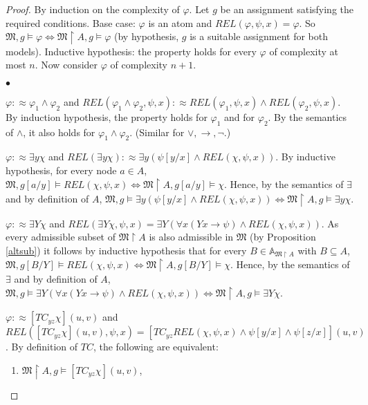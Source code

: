 \documentclass{LMCS}
\newcommand{\frM}{\mathfrak{M}}
\begin{document}
\begin{proof}
By induction on the complexity of $\varphi$. Let $g$ be an
assignment satisfying the required conditions. Base case:
$\varphi$ is an atom and $REL(\varphi,\psi,x)=\varphi$. So $\frM,g
\models \varphi \Leftrightarrow \frM \upharpoonright A,g \models
\varphi$ (by hypothesis, $g$ is a suitable assignment for both
models). Inductive hypothesis: the property holds for every
$\varphi$ of complexity at most $n$. Now consider $\varphi$ of
complexity $n+1$.
\begin{iteMize}{$\bullet$}
 \item  $\varphi :\approx\varphi_1 \wedge \varphi_2$ and $REL(\varphi_1 \wedge \varphi_2,\psi,x):\approx REL(\varphi_1,\psi,x)\wedge REL(\varphi_2,\psi,x)$. By induction hypothesis, the property holds for $\varphi_1$ and for $\varphi_2$. By the semantics of $\wedge$, it also holds for $\varphi_1 \wedge \varphi_2$. (Similar for $\vee, \rightarrow, \neg$.)
 \item $\varphi :\approx \exists y \chi$ and $REL(\exists y \chi):\approx\exists y (\psi[y/x] \land REL(\chi,\psi,x))$. By inductive hypothesis, for every node $a \in A$, $\frM,g[a/y] \models REL(\chi,\psi,x) \Leftrightarrow \frM \upharpoonright A, g[a/y] \models \chi$. Hence, by the semantics of $\exists$ and by definition of $A$, $\frM,g \models \exists y (\psi[y/x] \land REL(\chi,\psi,x)) \Leftrightarrow \frM \upharpoonright A, g \models \exists y \chi$.
 \item $\varphi :\approx\exists Y \chi$ and $REL(\exists Y
   \chi,\psi,x)=\exists Y (\forall x(Yx \rightarrow \psi) \land
   REL(\chi,\psi,x))$. As every admissible subset of $\frM
   \upharpoonright A$ is also admissible in $\frM$ (by Proposition
   \ref{altsub}) it follows by inductive hypothesis that for every $B
   \in \mathbb{A}_{\frM\upharpoonright A}$ with $B\subseteq A$, $\frM,g[B/Y] \models REL(\chi,\psi,x) \Leftrightarrow \frM \upharpoonright A, g[B/Y] \models \chi$. Hence, by the semantics of $\exists$ and by definition of $A$, $\frM,g \models \exists Y (\forall x(Yx \rightarrow \psi) \land REL(\chi,\psi,x)) \Leftrightarrow \frM \upharpoonright A, g \models \exists Y \chi$.
\item \sloppy$\varphi :\approx [TC_{yz}\chi](u,v)$ and $REL([TC_{yz}\chi](u,v),\psi,x)=[TC_{yz} REL(\chi,\psi,x) \wedge \psi[y/x] \wedge \psi[z/x]](u,v)$.
By definition of $TC$, the following are equivalent:
\begin{enumerate}[$1.$]
\item  $\frM \upharpoonright A, g \models [TC_{yz}\chi](u,v)$,

\end{enumerate}
\end{iteMize}
\end{proof}
\end{document}
